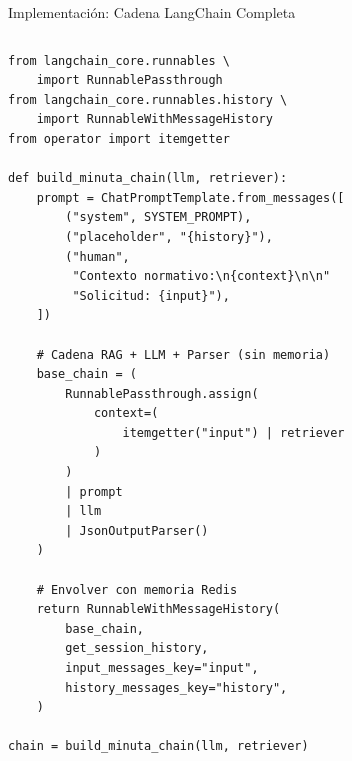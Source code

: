 \documentclass[aspectratio=169]{beamer}
\begin{document}
\begin{frame}[fragile]{Implementación: Cadena LangChain Completa}
  \begin{columns}
\begin{lstlisting}[style=pythonstyle, title=minuta\_chain.py -- Sistema completo]
from langchain_core.runnables \
    import RunnablePassthrough
from langchain_core.runnables.history \
    import RunnableWithMessageHistory
from operator import itemgetter

def build_minuta_chain(llm, retriever):
    prompt = ChatPromptTemplate.from_messages([
        ("system", SYSTEM_PROMPT),
        ("placeholder", "{history}"),
        ("human",
         "Contexto normativo:\n{context}\n\n"
         "Solicitud: {input}"),
    ])

    # Cadena RAG + LLM + Parser (sin memoria)
    base_chain = (
        RunnablePassthrough.assign(
            context=(
                itemgetter("input") | retriever
            )
        )
        | prompt
        | llm
        | JsonOutputParser()
    )

    # Envolver con memoria Redis
    return RunnableWithMessageHistory(
        base_chain,
        get_session_history,
        input_messages_key="input",
        history_messages_key="history",
    )

chain = build_minuta_chain(llm, retriever)


\end{lstlisting}
\end{columns}
\end{frame}
\end{document}
